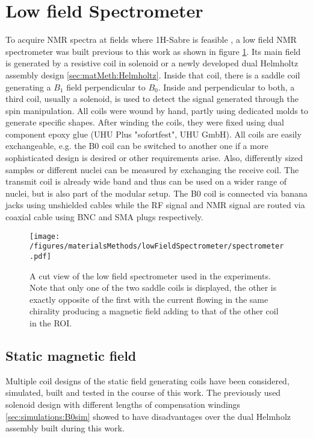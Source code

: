         \section{Low field Spectrometer}
        \label{sec:matMeth:lowFieldSpectrometer}
        To acquire NMR spectra at fields where 1H-Sabre is feasible \cite{rayner_signal_2018}, a low field NMR spectrometer was built \cite{borowiak_battery-driven_2013-1} previous to this work as shown in figure \ref{figure:materialsMethods:lowFieldSpec}. Its main field is generated by a resistive coil in solenoid or a newly developed dual Helmholtz assembly design \ref{sec:matMeth:Helmholtz}. Inside that coil, there is a saddle coil generating a $B_1$ field perpendicular to $B_0$. Inside and perpendicular to both, a third coil, usually a solenoid, is used to detect the signal generated through the spin manipulation. All coils were wound by hand, partly using dedicated molds to generate specific shapes. After winding the coils, they were fixed using dual component epoxy glue (UHU Plus "sofortfest", UHU GmbH).
        All coils are easily exchangeable, e.g. the B0 coil can be switched to another one if a more sophisticated design is desired or other requirements arise. Also, differently sized samples or different nuclei can be measured by exchanging the receive coil. The transmit coil is already wide band and thus can be used on a wider range of nuclei, but is also part of the modular setup. The B0 coil is connected via banana jacks using unshielded cables while the RF signal and NMR signal are routed via coaxial cable using BNC  and SMA plugs respectively.
        \begin{figure}
            \label{figure:matMeth:lowFieldSpectrometer}
            \texttt{[image: /figures/materialsMethods/lowFieldSpectrometer/spectrometer.pdf]}
            \caption[Schematic view low field spectrometer]{A cut view of the low field spectrometer used in the experiments. Note that only one of the two saddle coils is displayed, the other is exactly opposite of the first with the current flowing in the same chirality producing a magnetic field adding to that of the other coil in the ROI. }
            \label{figure:materialsMethods:lowFieldSpec}
        \end{figure}
        \subsection{Static magnetic field}
            Multiple coil designs of the static field generating coils have been  considered, simulated, built and tested in the course of this work. The previously used solenoid design with different lengths of compensation windings \ref{sec:simulations:B0sim} showed to have disadvantages over the dual Helmholz assembly built during this work.
